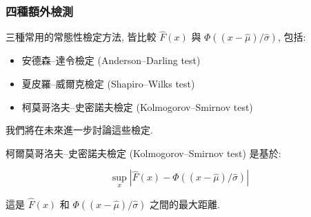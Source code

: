 \documentclass[letterpaper]{article}
\begin{document}
		\subsubsection{四種額外檢測}
		三種常用的常態性檢定方法, 皆比較 \(\hat{F} (x) \) 與 \(\Phi ( (x - \hat{\mu}) / \hat{\sigma}) \), 包括: 
		
		\begin{itemize}
			\item 安德森–達令檢定 (Anderson–Darling test) 
			\item 夏皮羅–威爾克檢定 (Shapiro–Wilks test) 
			\item 柯莫哥洛夫–史密諾夫檢定 (Kolmogorov–Smirnov test) 
		\end{itemize}
		
		我們將在未來進一步討論這些檢定. 
		
		柯爾莫哥洛夫–史密諾夫檢定 (Kolmogorov–Smirnov test) 是基於: 
		
		
		$$
		\sup _{x}|\hat{F} (x) -\Phi ( (x-\hat{\mu}) / \hat{\sigma}) |
		$$
		
		這是 $\hat{F} (x) $ 和 $\Phi ( (x-\hat{\mu}) / \hat{\sigma}) $ 之間的最大距離. 
		
		
	
\end{document}
